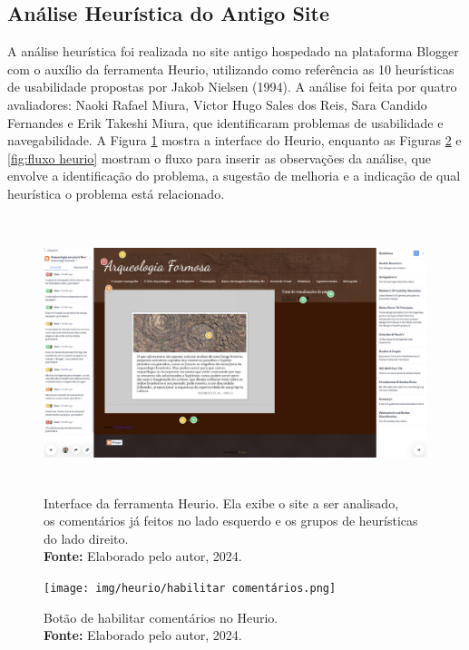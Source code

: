 \subsection{Análise Heurística do Antigo Site}
A análise heurística foi realizada no site antigo hospedado na plataforma Blogger com o auxílio da ferramenta Heurio, utilizando como referência as 10 heurísticas de usabilidade propostas por Jakob Nielsen (1994). A análise foi feita por quatro avaliadores: Naoki Rafael Miura, Victor Hugo Sales dos Reis, Sara Candido Fernandes e Erik Takeshi Miura, que identificaram problemas de usabilidade e navegabilidade.
A Figura \ref{fig:interface heurio} mostra a interface do Heurio, enquanto as Figuras \ref{fig:comentario heurio} e \ref{fig:fluxo heurio} mostram o fluxo para inserir as observações da análise, que envolve a identificação do problema, a sugestão de melhoria e a indicação de qual heurística o problema está relacionado.
\begin{figure}[H]
    \centering
    \includegraphics[height=8cm, keepaspectratio]{img/heurio/interface heurio.png}
    \caption{ Interface da ferramenta Heurio. Ela exibe o site a ser analisado, \\ os comentários já feitos no lado esquerdo e os grupos de heurísticas do lado direito. \\
        \textbf{Fonte:} Elaborado pelo autor, 2024.}
    \label{fig:interface heurio}
\end{figure}

\begin{figure}[H]
    \centering
    \texttt{[image: img/heurio/habilitar comentários.png]}
    \caption{ Botão de habilitar comentários no Heurio.\\
        \textbf{Fonte:} Elaborado pelo autor, 2024.}
    \label{fig:comentario heurio}
\end{figure}

